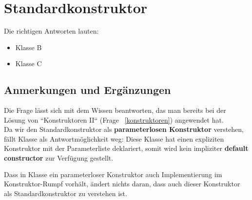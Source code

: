 \chapter{Standardkonstruktor}

Die richtigen Antworten lauten:

\begin{itemize}
    \item Klasse B
    \item Klasse C
\end{itemize}


\section*{Anmerkungen und Ergänzungen}

Die Frage lässt sich mit dem Wissen beantworten, das man bereits bei der Lösung von ``Konstruktoren II`` (Frage ~\ref{konstruktoren}) angewendet hat.\\

Da wir den Standardkonstruktor als \textbf{parameterlosen Konstruktor} verstehen, fällt Klasse  als
Antwortmöglichkeit weg: Diese Klasse hat einen expliziten Konstruktor mit der Parameterliste  deklariert,
somit wird kein impliziter \textbf{default constructor} zur Verfügung gestellt.

Dass in Klasse  ein parameterloser Konstruktor auch Implementierung im Konstruktor-Rumpf vorhält, ändert nichts daran,
dass auch dieser Konstruktor als Standardkonstruktor zu verstehen ist.